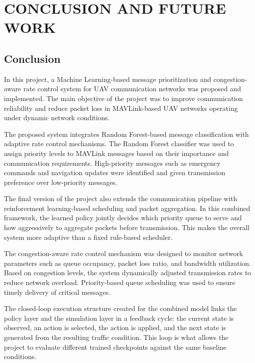\chapter{CONCLUSION AND FUTURE WORK}


\section{Conclusion}

In this project, a Machine Learning-based message 
prioritization and congestion-aware rate control 
system for UAV communication networks was proposed 
and implemented. The main objective of the project 
was to improve communication reliability and reduce 
packet loss in MAVLink-based UAV networks operating 
under dynamic network conditions.

The proposed system integrates Random Forest-based 
message classification with adaptive rate control 
mechanisms. The Random Forest classifier was used 
to assign priority levels to MAVLink messages based 
on their importance and communication requirements. 
High-priority messages such as emergency commands 
and navigation updates were identified and given 
transmission preference over low-priority messages.

The final version of the project also extends the 
communication pipeline with reinforcement learning-based 
scheduling and packet aggregation. In this combined 
framework, the learned policy jointly decides which 
priority queue to serve and how aggressively to aggregate 
packets before transmission. This makes the overall system 
more adaptive than a fixed rule-based scheduler.

The congestion-aware rate control mechanism was 
designed to monitor network parameters such as 
queue occupancy, packet loss ratio, and bandwidth 
utilization. Based on congestion levels, the system 
dynamically adjusted transmission rates to reduce 
network overload. Priority-based queue scheduling 
was used to ensure timely delivery of critical 
messages.

The closed-loop execution structure created for the 
combined model links the policy layer and the simulation 
layer in a feedback cycle: the current state is observed, 
an action is selected, the action is applied, and the next 
state is generated from the resulting traffic condition. 
This loop is what allows the project to evaluate different 
trained checkpoints against the same baseline conditions.


